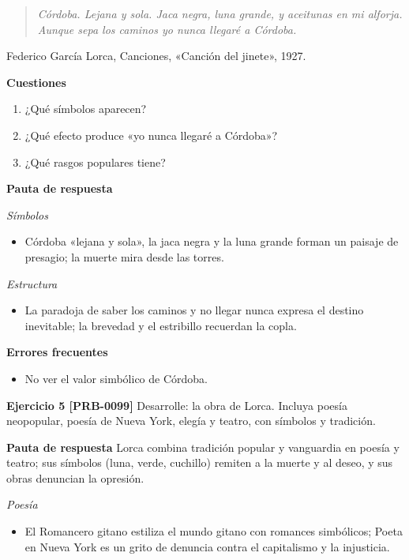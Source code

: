 \documentclass{book}
\begin{document}
\begin{quote}
\itshape Córdoba. Lejana y sola. Jaca negra, luna grande, y aceitunas en mi alforja. Aunque sepa los caminos yo nunca llegaré a Córdoba.
\end{quote}
{\noindent\footnotesize Federico García Lorca, Canciones, «Canción del jinete», 1927.\par}

\noindent\textbf{Cuestiones}
\begin{enumerate}
\item ¿Qué símbolos aparecen?
\item ¿Qué efecto produce «yo nunca llegaré a Córdoba»?
\item ¿Qué rasgos populares tiene?
\end{enumerate}

\noindent\textbf{Pauta de respuesta}

\noindent\textit{Símbolos}
\begin{itemize}
\item Córdoba «lejana y sola», la jaca negra y la luna grande forman un paisaje de presagio; la muerte mira desde las torres.
\end{itemize}

\noindent\textit{Estructura}
\begin{itemize}
\item La paradoja de saber los caminos y no llegar nunca expresa el destino inevitable; la brevedad y el estribillo recuerdan la copla.
\end{itemize}

\noindent\textbf{Errores frecuentes}
\begin{itemize}
\item No ver el valor simbólico de Córdoba.
\end{itemize}

\noindent\textbf{Ejercicio 5 [PRB-0099]}
Desarrolle: la obra de Lorca. Incluya poesía neopopular, poesía de Nueva York, elegía y teatro, con símbolos y tradición.


\noindent\textbf{Pauta de respuesta}
Lorca combina tradición popular y vanguardia en poesía y teatro; sus símbolos (luna, verde, cuchillo) remiten a la muerte y al deseo, y sus obras denuncian la opresión.


\noindent\textit{Poesía}
\begin{itemize}
\item El Romancero gitano estiliza el mundo gitano con romances simbólicos; Poeta en Nueva York es un grito de denuncia contra el capitalismo y la injusticia.
\end{itemize}
\end{document}
